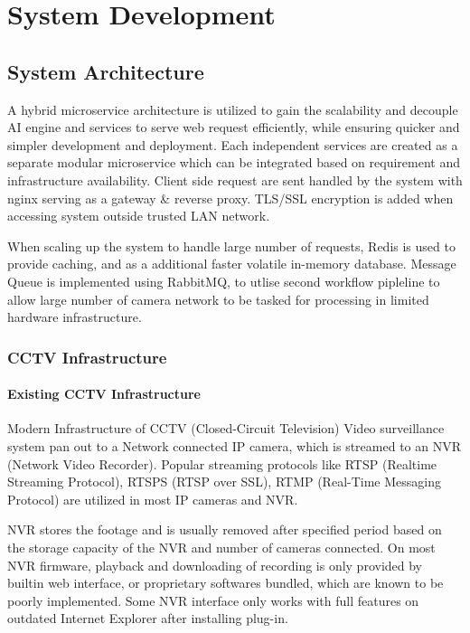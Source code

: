 \chapter{System Development}


\section{System Architecture}

A hybrid microservice architecture is utilized to gain the scalability and decouple AI engine and services to serve web request efficiently, while ensuring quicker and simpler development and deployment. Each independent services are created as a separate modular microservice which can be integrated based on requirement and infrastructure availability.
Client side request are sent handled by the system with nginx serving as a gateway \& reverse proxy. TLS/SSL encryption is added when accessing system outside trusted LAN network. 

When scaling up the system to handle large number of requests, Redis is used to provide caching, and as a additional faster volatile in-memory database. Message Queue is implemented using RabbitMQ, to utlise second workflow pipleline to allow large number of camera network to be tasked for processing in limited hardware infrastructure.


\subsection{CCTV Infrastructure}

\subsubsection{Existing CCTV Infrastructure}
Modern Infrastructure of CCTV (Closed-Circuit Television) Video surveillance system pan out to a Network connected IP camera, which is streamed to an NVR (Network Video Recorder). Popular streaming protocols like RTSP (Realtime Streaming Protocol), RTSPS (RTSP over SSL), RTMP (Real-Time Messaging Protocol) are utilized in most IP cameras and NVR. 

NVR stores the footage and is usually removed after specified period based on the storage capacity of the NVR and number of cameras connected. On most NVR firmware, playback and downloading of recording is only provided by builtin web interface, or proprietary softwares bundled, which are known to be poorly implemented. Some NVR interface only works with full features on outdated Internet Explorer after installing plug-in.


